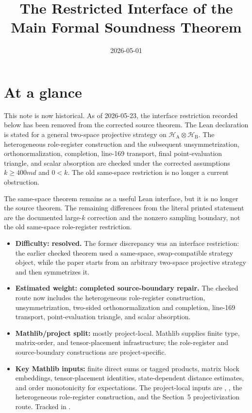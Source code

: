 \documentclass{article}
\title{The Restricted Interface of the Main Formal Soundness Theorem}
\author{}
\date{2026-05-01}
\begin{document}
\maketitle

\section{At a glance}

This note is now historical.  As of 2026-05-23, the interface restriction
recorded below has been removed from the corrected source theorem.  The Lean declaration
 is stated for a
general two-space projective strategy  on
\(\mathcal H_{\mathrm A}\otimes\mathcal H_{\mathrm B}\).  The heterogeneous
role-register construction and the subsequent unsymmetrization,
orthonormalization, completion, line-169 transport, final point-evaluation
triangle, and scalar absorption are checked under the corrected assumptions
\(k\ge 400md\) and \(0<k\).  The old same-space restriction is no longer a
current obstruction.

The same-space theorem  remains as a
useful Lean interface, but it is no longer the source theorem.  The remaining
differences from the literal printed statement are the documented large-\(k\)
correction and the nonzero sampling boundary, not the old same-space
role-register restriction.

\begin{itemize}
  \item \textbf{Difficulty: resolved.}  The former discrepancy was an interface
  restriction: the earlier checked theorem used a same-space, swap-compatible
  strategy object, while the paper starts from an arbitrary two-space projective
  strategy and then symmetrizes it.
  \item \textbf{Estimated weight: completed source-boundary repair.}  The
  checked route now includes the heterogeneous role-register construction,
  unsymmetrization, two-sided orthonormalization and completion, line-169
  transport, point-evaluation triangle, and scalar absorption.
  \item \textbf{Mathlib/project split:} mostly project-local.  Mathlib supplies
  finite type, matrix-order, and tensor-placement infrastructure; the
  role-register and source-boundary constructions are project-specific.
  \item \textbf{Key Mathlib inputs:} finite direct sums or tagged products,
  matrix block embeddings, tensor-placement identities, state-dependent
  distance estimates, and order monotonicity for expectations.  The
  project-local inputs are ,
  , the heterogeneous role-register
  construction, and the Section~5 projectivization route.  Tracked in
  .
\end{itemize}
\end{document}
